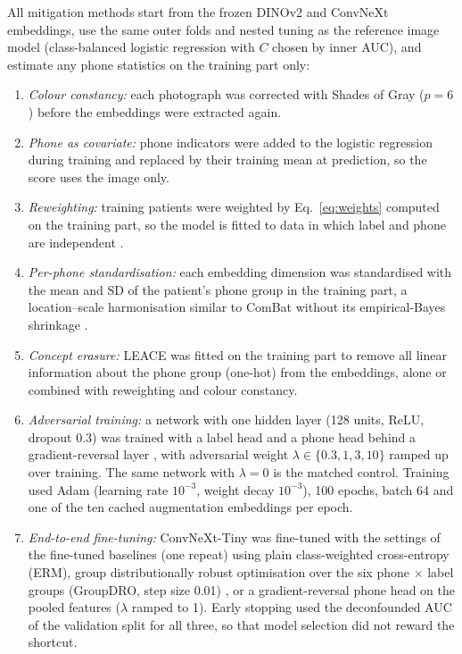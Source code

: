 \documentclass[preprint,12pt]{elsarticle}
\begin{document}
All mitigation methods start from the frozen DINOv2 and ConvNeXt embeddings, use the same outer folds and nested tuning as the reference image model (class-balanced logistic regression with $C$ chosen by inner AUC), and estimate any phone statistics on the training part only:
\begin{enumerate}
\item \textit{Colour constancy:} each photograph was corrected with Shades of Gray ($p = 6$) \cite{finlayson2004shades,barata2015colour} before the embeddings were extracted again.
\item \textit{Phone as covariate:} phone indicators were added to the logistic regression during training and replaced by their training mean at prediction, so the score uses the image only.
\item \textit{Reweighting:} training patients were weighted by Eq.~\eqref{eq:weights} computed on the training part, so the model is fitted to data in which label and phone are independent \cite{makar2022causally}.
\item \textit{Per-phone standardisation:} each embedding dimension was standardised with the mean and SD of the patient's phone group in the training part, a location--scale harmonisation similar to ComBat without its empirical-Bayes shrinkage \cite{johnson2007combat}.
\item \textit{Concept erasure:} LEACE \cite{belrose2023leace} was fitted on the training part to remove all linear information about the phone group (one-hot) from the embeddings, alone or combined with reweighting and colour constancy.
\item \textit{Adversarial training:} a network with one hidden layer (128 units, ReLU, dropout 0.3) was trained with a label head and a phone head behind a gradient-reversal layer \cite{ganin2016dann}, with adversarial weight $\lambda \in \{0.3, 1, 3, 10\}$ ramped up over training. The same network with $\lambda = 0$ is the matched control. Training used Adam (learning rate $10^{-3}$, weight decay $10^{-3}$), 100 epochs, batch 64 and one of the ten cached augmentation embeddings per epoch.
\item \textit{End-to-end fine-tuning:} ConvNeXt-Tiny was fine-tuned with the settings of the fine-tuned baselines (one repeat) using plain class-weighted cross-entropy (ERM), group distributionally robust optimisation over the six phone $\times$ label groups (GroupDRO, step size 0.01) \cite{sagawa2020dro}, or a gradient-reversal phone head on the pooled features ($\lambda$ ramped to 1). Early stopping used the deconfounded AUC of the validation split for all three, so that model selection did not reward the shortcut.
\end{enumerate}
\end{document}
